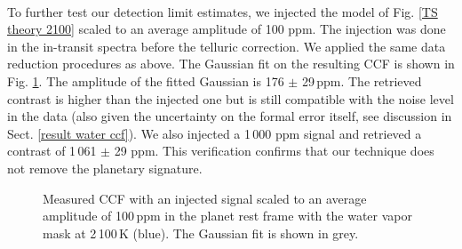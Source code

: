 \documentclass{aa}
\begin{document}
\\
To further test our detection limit estimates, we injected the model of Fig. \ref{TS theory 2100} scaled to an average amplitude of 100 ppm. The injection was done in the in-transit spectra before the telluric correction. We applied the same data reduction procedures as above. The Gaussian fit on the resulting CCF is shown in Fig. \ref{CCF eau 2100K planet base injection}. The amplitude of the fitted Gaussian is 176 $\pm$ 29\,ppm. The retrieved contrast is higher than the injected one but is still compatible with the noise level in the data (also given the uncertainty on the formal error itself, see discussion in Sect. \ref{result water ccf}). We also injected a 1\,000 ppm signal and retrieved a contrast of 1\,061 $\pm$ 29 ppm. This verification confirms that our technique does not remove the planetary signature.

\begin{figure}[h]
\caption[CCF eau 2100K planete base]{Measured CCF with an injected signal scaled to an average amplitude of 100\,ppm in the planet rest frame with the water vapor mask at 2\,100\,K (blue). The Gaussian fit is shown in grey.}
\label{CCF eau 2100K planet base injection}
\end{figure}
\end{document}
